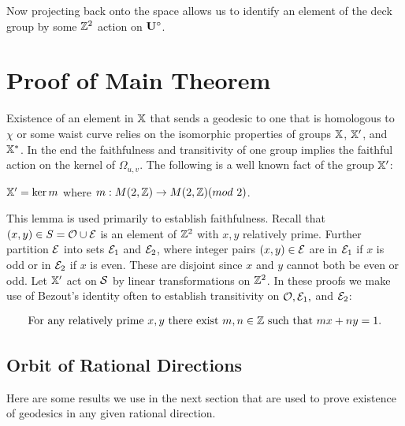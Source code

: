 \documentclass[a4paper, 11pt]{article}
\begin{document}
Now projecting back onto the space allows us to identify an element of the deck group by some $\mathbb{Z}^2$ action on $\mathbf{U}^\circ$. 


\section{Proof of Main Theorem}
Existence of an element in $\mathbb{X}$ that sends a geodesic to one that is homologous to $\chi$ or some waist curve relies on the isomorphic properties of groups $\mathbb{X}$, $\mathbb{X}'$, and $\mathbb{X}^*$. In the end the faithfulness and transitivity of one group implies the faithful action on the kernel of $\Omega_{u,v}$. The following is a well known fact of the group $\mathbb{X}'$:
\begin{lem}
$\mathbb{X}'=\ker m$ where $m:M(2,\mathbb{Z})\rightarrow M(2,\mathbb{Z})(mod~2)$.
\end{lem}
This lemma is used primarily to establish faithfulness.
Recall that $(x,y)\in S=\mathcal{O}\cup \mathcal{E}$ is an element of $\mathbb{Z}^2$ with $x,y$ relatively prime. Further partition $\mathcal{E}$ into sets $\mathcal{E}_1$ and $\mathcal{E}_2$, where integer pairs $(x,y)\in\mathcal{E}$ are in $\mathcal{E}_1$ if $x$ is odd or in $\mathcal{E}_2$ if $x$ is even. These are disjoint since $x$ and $y$ cannot both be even or odd. Let $\mathbb{X}'$ act on $\mathcal{S}$ by linear transformations on $\mathbb{Z}^2$. In these proofs we make use of Bezout's identity often to establish transitivity on $\mathcal{O},\mathcal{E}_1,$ and $\mathcal{E}_2$: 

\begin{align}
\text{For any relatively prime }x,y\text{ there exist }m,n\in\mathbb{Z}\text{ such that }mx+ny=1.
\end{align}

\subsection{Orbit of Rational Directions}
Here are some results we use in the next section that are used to prove existence of geodesics in any given rational direction.
\end{document}
